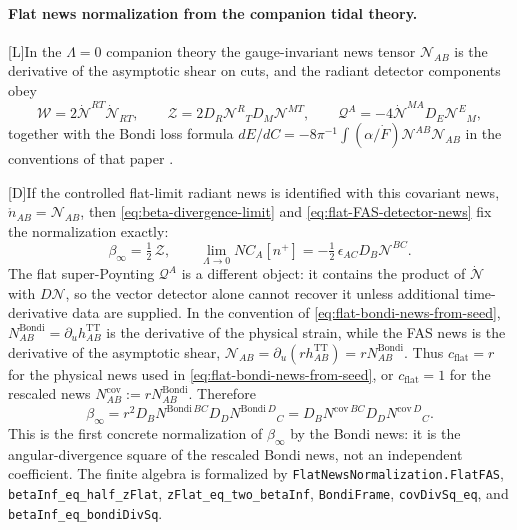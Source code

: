 \documentclass[11pt,a4paper]{article}
\newcommand{\statusL}{\textsf{[L]}}
\newcommand{\statusD}{\textsf{[D]}}
\begin{document}
\paragraph{Flat news normalization from the companion tidal theory.}
\statusL In the \(\Lambda=0\) companion theory the gauge-invariant news tensor \(\mathcal N_{AB}\) is the derivative of the asymptotic shear on cuts, and the radiant detector components obey
\begin{equation}\label{eq:flat-FAS-detector-news}
  \mathcal W
  =
  2\dot{\mathcal N}^{RT}\dot{\mathcal N}_{RT},
  \qquad
  \mathcal Z
  =
  2D_R\mathcal N^R{}_T D_M\mathcal N^{MT},
  \qquad
  \mathcal Q^A
  =
  -4\dot{\mathcal N}^{MA}D_E\mathcal N^E{}_M ,
\end{equation}
together with the Bondi loss formula \(dE/dC=-8\pi^{-1}\int(\alpha/\dot F)\mathcal N^{AB}\mathcal N_{AB}\) in the conventions of that paper \cite{fabSen2022asymptoticFlat}.

\statusD If the controlled flat-limit radiant news is identified with this covariant news, \(\mathring n_{AB}=\mathcal N_{AB}\), then \eqref{eq:beta-divergence-limit} and \eqref{eq:flat-FAS-detector-news} fix the normalization exactly:
\begin{equation}\label{eq:beta-flat-detector-normalization}
  \beta_\infty
  =
  \tfrac12\,\mathcal Z ,
  \qquad
  \lim_{\Lambda\to0}N C_A[n^+]
  =
  -\tfrac12\,\epsilon_{AC}D_B\mathcal N^{BC} .
\end{equation}
The flat super-Poynting \(\mathcal Q^A\) is a different object: it contains the product of \(\dot{\mathcal N}\) with \(D\mathcal N\), so the vector detector alone cannot recover it unless additional time-derivative data are supplied.  In the convention of \eqref{eq:flat-bondi-news-from-seed}, \(N^{\mathrm{Bondi}}_{AB}=\partial_u h^{\mathrm{TT}}_{AB}\) is the derivative of the physical strain, while the FAS news is the derivative of the asymptotic shear, \(\mathcal N_{AB}=\partial_u(rh^{\mathrm{TT}}_{AB})=rN^{\mathrm{Bondi}}_{AB}\).  Thus \(c_{\mathrm{flat}}=r\) for the physical news used in \eqref{eq:flat-bondi-news-from-seed}, or \(c_{\mathrm{flat}}=1\) for the rescaled news \(N^{\mathrm{cov}}_{AB}:=rN^{\mathrm{Bondi}}_{AB}\).  Therefore
\begin{equation}\label{eq:beta-flat-bondi-divergence}
  \beta_\infty
  =
  r^2
  D_B N^{\mathrm{Bondi}\,BC}
  D_D N^{\mathrm{Bondi}\,D}{}_{C}
  =
  D_B N^{\mathrm{cov}\,BC}
  D_D N^{\mathrm{cov}\,D}{}_{C} .
\end{equation}
This is the first concrete normalization of \(\beta_\infty\) by the Bondi news: it is the angular-divergence square of the rescaled Bondi news, not an independent coefficient.  The finite algebra is formalized by \texttt{FlatNewsNormalization.FlatFAS}, \texttt{betaInf\_eq\_half\_zFlat}, \texttt{zFlat\_eq\_two\_betaInf}, \texttt{BondiFrame}, \texttt{covDivSq\_eq}, and \texttt{betaInf\_eq\_bondiDivSq}.
\end{document}
